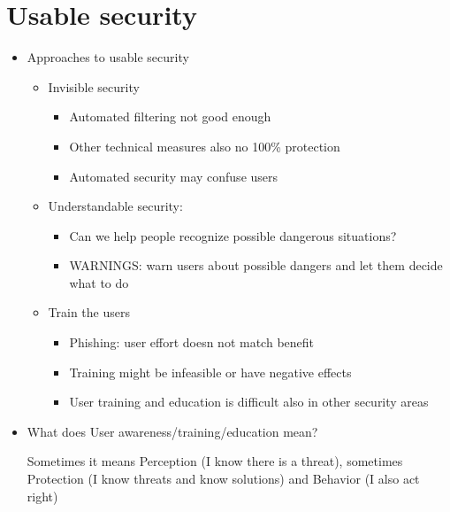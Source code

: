\documentclass[a4paper,12pt]{scrartcl}
\begin{document}
\section{Usable security}
\begin{itemize}
	\item
		Approaches to usable security
		\begin{itemize}
			\item
				Invisible security
				\begin{itemize}
					\item
						Automated filtering not good enough
					\item
						Other technical measures also no 100\% protection
					\item
						Automated security may confuse users
				\end{itemize}
			\item
				Understandable security:
				\begin{itemize}
					\item
						Can we help people recognize possible dangerous situations?
					\item
						WARNINGS: warn users about possible dangers and let them decide what to do
				\end{itemize}
			\item
				Train the users
				\begin{itemize}
					\item
						Phishing: user effort doesn not match benefit
					\item
						Training might be infeasible or have negative effects
					\item
						User training and education is difficult also in other security areas
				\end{itemize}
		\end{itemize}

	\item
		What does User awareness/training/education mean?

		Sometimes it means Perception (I know there is a threat), sometimes Protection (I know threats and know solutions) and Behavior (I also act right)


\end{itemize}
\end{document}
